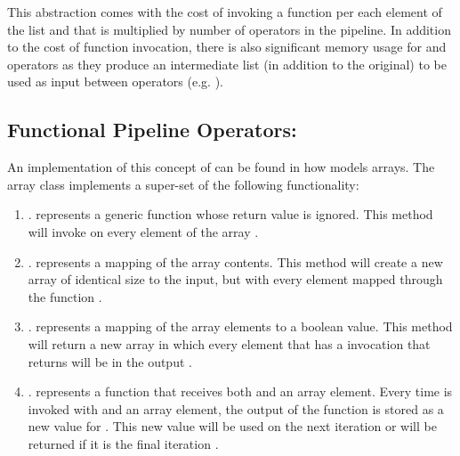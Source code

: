 This abstraction comes with the cost of invoking a function per each element of the list and that is multiplied by number of operators in the pipeline. In addition to the cost of function invocation, there is also significant memory usage for  and  operators as they produce an intermediate list (in addition to the original) to be used as input between operators (e.g. ).  

\subsection{Functional Pipeline Operators: \javascript}

An implementation of this concept of \pipelines can be found in how \javascript models arrays.  The array class implements a super-set of the following functionality:

\begin{enumerate}
  \item {}.   represents a generic function whose return value is ignored.  This method will invoke  on every element of the array \cite{arrayforeach16}.

  \item {}.   represents a mapping of the array contents.  This method will create a new array of identical size to the input, but with every element mapped through the  function \cite{arraymap16}.

  \item {}.   represents a mapping of the array elements to a boolean value.  This method will return a new array in which every element that has a  invocation that returns  will be in the output \cite{arrayfilter16}.

  \item {}.   represents a function that receives both  and an array element. Every time  is invoked with  and an array element, the output of the function is stored as a new value for .  This new value will be used on the next iteration or will be returned if it is the final iteration \cite{arrayreduce16}.

\end{enumerate}

